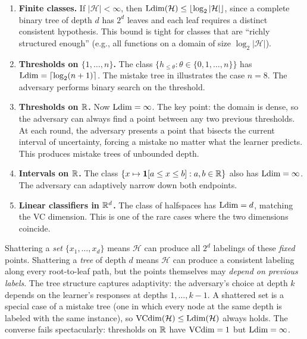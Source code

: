 \begin{example}
\label{ex:ldim-examples}
\begin{enumerate}[label=(\alph*), leftmargin=*, itemsep=4pt]
\item \textbf{Finite classes.} If $|\mathcal{H}| < \infty$, then $\mathrm{Ldim}(\mathcal{H}) \leq \lfloor \log_2 |\mathcal{H}| \rfloor$, since a complete binary tree of depth $d$ has $2^d$ leaves and each leaf requires a distinct consistent hypothesis. This bound is tight for classes that are ``richly structured enough'' (e.g., all functions on a domain of size $\log_2 |\mathcal{H}|$).

\item \textbf{Thresholds on $\{1, \ldots, n\}$.} The class $\{h_{\leq \theta} : \theta \in \{0, 1, \ldots, n\}\}$ has $\mathrm{Ldim} = \lceil \log_2(n+1) \rceil$. The mistake tree in  illustrates the case $n = 8$. The adversary performs binary search on the threshold.

\item \textbf{Thresholds on $\mathbb{R}$.} Now $\mathrm{Ldim} = \infty$. The key point: the domain is dense, so the adversary can always find a point between any two previous thresholds. At each round, the adversary presents a point that bisects the current interval of uncertainty, forcing a mistake no matter what the learner predicts. This produces mistake trees of unbounded depth.

\item \textbf{Intervals on $\mathbb{R}$.} The class $\{x \mapsto \mathbf{1}[a \leq x \leq b] : a, b \in \mathbb{R}\}$ also has $\mathrm{Ldim} = \infty$. The adversary can adaptively narrow down both endpoints.

\item \textbf{Linear classifiers in $\mathbb{R}^d$.} The class of halfspaces has $\mathrm{Ldim} = d$, matching the VC dimension. This is one of the rare cases where the two dimensions coincide.
\end{enumerate}
\end{example}

\begin{remark}
\label{rmk:sets-vs-trees}
Shattering a \emph{set} $\{x_1, \ldots, x_d\}$ means $\mathcal{H}$ can produce all $2^d$ labelings of these \emph{fixed} points. Shattering a \emph{tree} of depth $d$ means $\mathcal{H}$ can produce a consistent labeling along every root-to-leaf path, but the points themselves may \emph{depend on previous labels}. The tree structure captures adaptivity: the adversary's choice at depth $k$ depends on the learner's responses at depths $1, \ldots, k-1$. A shattered set is a special case of a mistake tree (one in which every node at the same depth is labeled with the same instance), so $\mathrm{VCdim}(\mathcal{H}) \leq \mathrm{Ldim}(\mathcal{H})$ always holds. The converse fails spectacularly: thresholds on $\mathbb{R}$ have $\mathrm{VCdim} = 1$ but $\mathrm{Ldim} = \infty$.
\end{remark}

